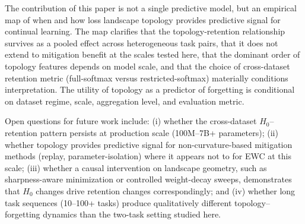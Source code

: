 \documentclass[10pt,twocolumn]{article}
\begin{document}
The contribution of this paper is not a single predictive model, but an empirical map of when and how loss landscape topology provides predictive signal for continual learning. The map clarifies that the topology-retention relationship survives as a pooled effect across heterogeneous task pairs, that it does not extend to mitigation benefit at the scales tested here, that the dominant order of topology features depends on model scale, and that the choice of cross-dataset retention metric (full-softmax versus restricted-softmax) materially conditions interpretation. The utility of topology as a predictor of forgetting is conditional on dataset regime, scale, aggregation level, and evaluation metric.

Open questions for future work include: (i) whether the cross-dataset $H_0$--retention pattern persists at production scale (100M--7B+ parameters); (ii) whether topology provides predictive signal for non-curvature-based mitigation methods (replay, parameter-isolation) where it appears not to for EWC at this scale; (iii) whether a causal intervention on landscape geometry, such as sharpness-aware minimization or controlled weight-decay sweeps, demonstrates that $H_0$ changes drive retention changes correspondingly; and (iv) whether long task sequences (10--100+ tasks) produce qualitatively different topology--forgetting dynamics than the two-task setting studied here.


\end{document}
